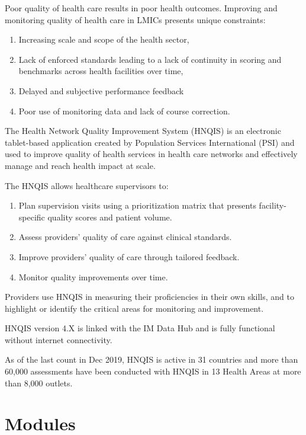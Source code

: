 \documentclass[]{book}
\providecommand{\tightlist}{%
  \setlength{\itemsep}{0pt}\setlength{\parskip}{0pt}}
\begin{document}
Poor quality of health care results in poor health outcomes. Improving and monitoring quality of health care in LMICs presents unique constraints:

\begin{enumerate}
\def\labelenumi{\arabic{enumi}.}
\tightlist
\item
  Increasing scale and scope of the health sector,
\item
  Lack of enforced standards leading to a lack of continuity in scoring and benchmarks across health facilities over time,
\item
  Delayed and subjective performance feedback
\item
  Poor use of monitoring data and lack of course correction.
\end{enumerate}

The Health Network Quality Improvement System (HNQIS) is an electronic tablet-based application created by Population Services International (PSI) and used to improve quality of health services in health care networks and effectively manage and reach health impact at scale.

The HNQIS allows healthcare supervisors to:

\begin{enumerate}
\def\labelenumi{\arabic{enumi}.}
\tightlist
\item
  Plan supervision visits using a prioritization matrix that presents facility-specific quality scores and patient volume.
\item
  Assess providers' quality of care against clinical standards.
\item
  Improve providers' quality of care through tailored feedback.
\item
  Monitor quality improvements over time.
\end{enumerate}

Providers use HNQIS in measuring their proficiencies in their own skills, and to highlight or identify the critical areas for monitoring and improvement.

HNQIS version 4.X is linked with the IM Data Hub and is fully functional without internet connectivity.

As of the last count in Dec 2019, HNQIS is active in 31 countries and more than 60,000 assessments have been conducted with HNQIS in 13 Health Areas at more than 8,000 outlets.

\hypertarget{modules}{%
\section{Modules}\label{modules}}
\end{document}
